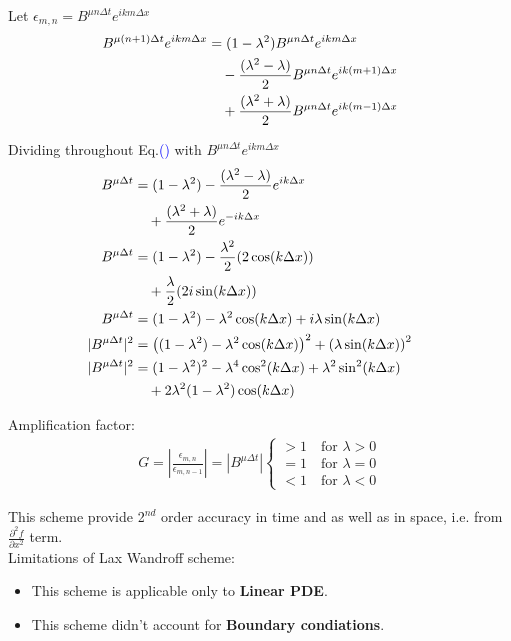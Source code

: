 \documentclass[fleqn,10pt]{SelfArx} %
\newcommand{\myeqref}[1]{Eq.\textcolor{blue}{\textup{(\getrefnumber{#1})}}}
\begin{document}
Let \( \epsilon_{m,n} = B^{\mu n \Delta t} e^{ikm\Delta x} \)
\begin{align*}
	\mspace{-25mu} B^{\mu (n+1) \Delta t} e^{ikm\Delta x} &= (1 - \lambda^2)B^{\mu n \Delta t} e^{ikm\Delta x} \\ &\quad - \frac{(\lambda^2- \lambda)}{2}B^{\mu n \Delta t} e^{ik (m+1) \Delta x} \\ &\quad + \frac{(\lambda^2 + \lambda)}{2}B^{\mu n \Delta t} e^{ik (m-1) \Delta x}
\end{align*}

Dividing throughout \myeqref{eq:20.5} with \( B^{\mu n \Delta t} e^{ikm\Delta x} \)
\begin{align*}
	\mspace{-25mu} B^{\mu \Delta t} &= (1 - \lambda^2) - \frac{(\lambda^2- \lambda)}{2} e^{ik \Delta x} \\ &\quad + \frac{(\lambda^2 + \lambda)}{2}e^{-ik \Delta x} \\
	\mspace{-25mu} B^{\mu \Delta t} &= (1 - \lambda^2) - \frac{\lambda^2}{2} (2\cos(k\Delta x)) \\ &\quad + \frac{\lambda}{2} (2i\sin(k\Delta x)) \\
	\mspace{-25mu} B^{\mu \Delta t} &= (1 - \lambda^2) - \lambda^2\cos(k\Delta x) + i\lambda\sin(k\Delta x) \\
	\mspace{-25mu} |B^{\mu \Delta t}|^2 &= \left((1 - \lambda^2) - \lambda^2\cos(k\Delta x)\right)^2 + \left(\lambda\sin(k\Delta x)\right)^2 \\
	\mspace{-25mu} |B^{\mu \Delta t}|^2 &= (1 - \lambda^2)^2 - \lambda^4\cos^2(k\Delta x) + \lambda^2\sin^2(k\Delta x) \\ &\quad + 2\lambda^2(1 - \lambda^2)\cos(k\Delta x) \\
\end{align*}

Amplification factor:
\begin{align*}
	G = \left|\frac{\epsilon_{m,n}}{\epsilon_{m,n-1}}\right| = \left|B^{\mu\Delta t}\right|
	\begin{cases}
		>1 \quad \text{for } \lambda > 0 \\
		=1 \quad \text{for } \lambda = 0 \\
		<1 \quad \text{for } \lambda < 0
	\end{cases}
\end{align*}

This scheme provide 2$^{nd}$ order accuracy in time and as well as in space, i.e. from \( \frac{\partial^2 f}{\partial x^2} \) term. \\

Limitations of Lax Wandroff scheme:
\begin{itemize}[noitemsep]
	\item This scheme is applicable only to \textbf{Linear PDE}.
	\item This scheme didn't account for \textbf{Boundary condiations}.
\end{itemize}

\clearpage



\end{document}
